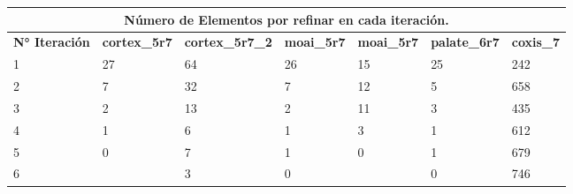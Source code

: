 \begin{table}[!ht]
\begin{tabular}{|lllllll|}
\hline
\multicolumn{7}{|c|}{Número de Elementos por refinar en cada iteración.}                                                                                                                                                                                                                    \\ \hline
\multicolumn{1}{|l|}{\textbf{N° Iteración}} & \multicolumn{1}{l|}{\textbf{cortex\_5r7}} & \multicolumn{1}{l|}{\textbf{cortex\_5r7\_2}} & \multicolumn{1}{l|}{\textbf{moai\_5r7}} & \multicolumn{1}{l|}{\textbf{moai\_5r7}} & \multicolumn{1}{l|}{\textbf{palate\_6r7}} & \textbf{coxis\_7} \\ \hline
\multicolumn{1}{|l|}{1}                     & \multicolumn{1}{l|}{27}                   & \multicolumn{1}{l|}{64}                      & \multicolumn{1}{l|}{26}                 & \multicolumn{1}{l|}{15}                 & \multicolumn{1}{l|}{25}                   & 242               \\ \hline
\multicolumn{1}{|l|}{2}                     & \multicolumn{1}{l|}{7}                    & \multicolumn{1}{l|}{32}                      & \multicolumn{1}{l|}{7}                  & \multicolumn{1}{l|}{12}                 & \multicolumn{1}{l|}{5}                    & 658               \\ \hline
\multicolumn{1}{|l|}{3}                     & \multicolumn{1}{l|}{2}                    & \multicolumn{1}{l|}{13}                      & \multicolumn{1}{l|}{2}                  & \multicolumn{1}{l|}{11}                 & \multicolumn{1}{l|}{3}                    & 435               \\ \hline
\multicolumn{1}{|l|}{4}                     & \multicolumn{1}{l|}{1}                    & \multicolumn{1}{l|}{6}                       & \multicolumn{1}{l|}{1}                  & \multicolumn{1}{l|}{3}                  & \multicolumn{1}{l|}{1}                    & 612               \\ \hline
\multicolumn{1}{|l|}{5}                     & \multicolumn{1}{l|}{0}                    & \multicolumn{1}{l|}{7}                       & \multicolumn{1}{l|}{1}                  & \multicolumn{1}{l|}{0}                  & \multicolumn{1}{l|}{1}                    & 679               \\ \hline
\multicolumn{1}{|l|}{6}                     & \multicolumn{1}{l|}{}                     & \multicolumn{1}{l|}{3}                       & \multicolumn{1}{l|}{0}                  & \multicolumn{1}{l|}{}                   & \multicolumn{1}{l|}{0}                    & 746               \\ \hline

\end{tabular}
\end{table}
